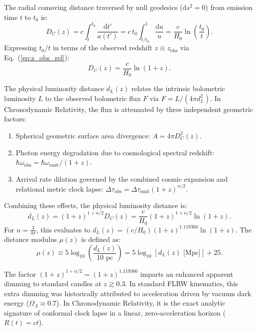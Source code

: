 \documentclass[aps,prd,reprint,superscriptaddress,nofootinbib,floatfix,amsmath,amssymb]{revtex4-2}
\begin{document}
The radial comoving distance traversed by null geodesics ($\mathrm{d}s^2 = 0$) from emission time $t$ to $t_0$ is:
\begin{equation}
D_C(z) = c \int_t^{t_0} \frac{\mathrm{d}t'}{a(t')} = c \, t_0 \int_{t/t_0}^1 \frac{\mathrm{d}u}{u} = \frac{c}{H_0} \ln\left( \frac{t_0}{t} \right).
\label{eq:comoving_int}
\end{equation}
Expressing $t_0/t$ in terms of the observed redshift $z \equiv z_{\text{obs}}$ via Eq.~(\ref{eq:z_obs_rel}):
\begin{equation}
D_C(z) = \frac{c}{H_0} \ln(1 + z).
\label{eq:comoving_dist}
\end{equation}

The physical luminosity distance $d_L(z)$ relates the intrinsic bolometric luminosity $L$ to the observed bolometric flux $F$ via $F = L / (4\pi d_L^2)$. In Chronodynamic Relativity, the flux is attenuated by three independent geometric factors:
\begin{enumerate}
    \item Spherical geometric surface area divergence: $A = 4\pi D_C^2(z)$.
    \item Photon energy degradation due to cosmological spectral redshift: $\hbar\omega_{\text{obs}} = \hbar\omega_{\text{emit}} / (1+z)$.
    \item Arrival rate dilation governed by the combined cosmic expansion and relational metric clock lapse: $\Delta\tau_{\text{obs}} = \Delta\tau_{\text{emit}} (1+z)^{n/2}$.
\end{enumerate}
Combining these effects, the physical luminosity distance is:
\begin{equation}
d_L(z) = (1+z)^{1 + n/2} D_C(z) = \frac{c}{H_0} (1+z)^{1 + n/2} \ln(1+z).
\label{eq:dL_exact}
\end{equation}
For $n = \frac{3}{4\pi}$, this evaluates to $d_L(z) = (c/H_0)(1+z)^{1.119366}\ln(1+z)$. The distance modulus $\mu(z)$ is defined as:
\begin{equation}
\mu(z) \equiv 5 \log_{10}\left( \frac{d_L(z)}{10\text{ pc}} \right) = 5 \log_{10}\left[ d_L(z)\text{ [Mpc]} \right] + 25.
\label{eq:mu_def}
\end{equation}

The factor $(1+z)^{1+n/2} = (1+z)^{1.119366}$ imparts an enhanced apparent dimming to standard candles at $z \gtrsim 0.3$. In standard FLRW kinematics, this extra dimming was historically attributed to acceleration driven by vacuum dark energy ($\Omega_\Lambda \approx 0.7$). In Chronodynamic Relativity, it is the exact analytic signature of conformal clock lapse in a linear, zero-acceleration horizon ($R(t) = ct$).
\end{document}
